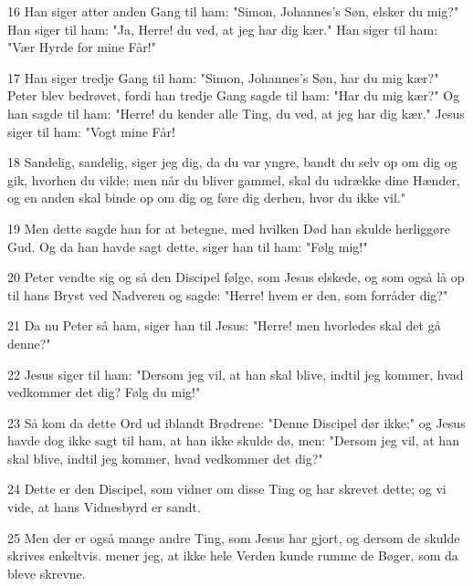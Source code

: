 \par 16 Han siger atter anden Gang til ham: "Simon, Johannes's Søn, elsker du mig?" Han siger til ham: "Ja, Herre! du ved, at jeg har dig kær." Han siger til ham: "Vær Hyrde for mine Får!"
\par 17 Han siger tredje Gang til ham: "Simon, Johannes's Søn, har du mig kær?" Peter blev bedrøvet, fordi han tredje Gang sagde til ham: "Har du mig kær?" Og han sagde til ham: "Herre! du kender alle Ting, du ved, at jeg har dig kær." Jesus siger til ham: "Vogt mine Får!
\par 18 Sandelig, sandelig, siger jeg dig, da du var yngre, bandt du selv op om dig og gik, hvorhen du vilde; men når du bliver gammel, skal du udrække dine Hænder, og en anden skal binde op om dig og føre dig derhen, hvor du ikke vil."
\par 19 Men dette sagde han for at betegne, med hvilken Død han skulde herliggøre Gud. Og da han havde sagt dette, siger han til ham: "Følg mig!"
\par 20 Peter vendte sig og så den Discipel følge, som Jesus elskede, og som også lå op til hans Bryst ved Nadveren og sagde: "Herre! hvem er den, som forråder dig?"
\par 21 Da nu Peter så ham, siger han til Jesus: "Herre! men hvorledes skal det gå denne?"
\par 22 Jesus siger til ham: "Dersom jeg vil, at han skal blive, indtil jeg kommer, hvad vedkommer det dig? Følg du mig!"
\par 23 Så kom da dette Ord ud iblandt Brødrene: "Denne Discipel dør ikke;" og Jesus havde dog ikke sagt til ham, at han ikke skulde dø, men: "Dersom jeg vil, at han skal blive, indtil jeg kommer, hvad vedkommer det dig?"
\par 24 Dette er den Discipel, som vidner om disse Ting og har skrevet dette; og vi vide, at hans Vidnesbyrd er sandt.
\par 25 Men der er også mange andre Ting, som Jesus har gjort, og dersom de skulde skrives enkeltvis. mener jeg, at ikke hele Verden kunde rumme de Bøger, som da bleve skrevne.



